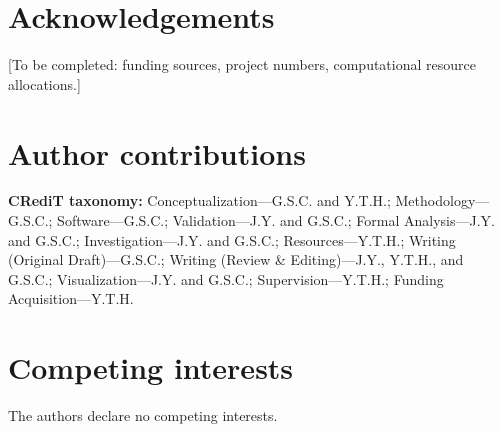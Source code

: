 \documentclass[twoside,11pt]{article}
\begin{document}
\section*{Acknowledgements}
[To be completed: funding sources, project numbers, computational resource allocations.]

\section*{Author contributions}
\textbf{CRediT taxonomy:} Conceptualization---G.S.C. and Y.T.H.; Methodology---G.S.C.; Software---G.S.C.; Validation---J.Y. and G.S.C.; Formal Analysis---J.Y. and G.S.C.; Investigation---J.Y. and G.S.C.; Resources---Y.T.H.; Writing (Original Draft)---G.S.C.; Writing (Review \& Editing)---J.Y., Y.T.H., and G.S.C.; Visualization---J.Y. and G.S.C.; Supervision---Y.T.H.; Funding Acquisition---Y.T.H.

\section*{Competing interests}
The authors declare no competing interests.



\end{document}

